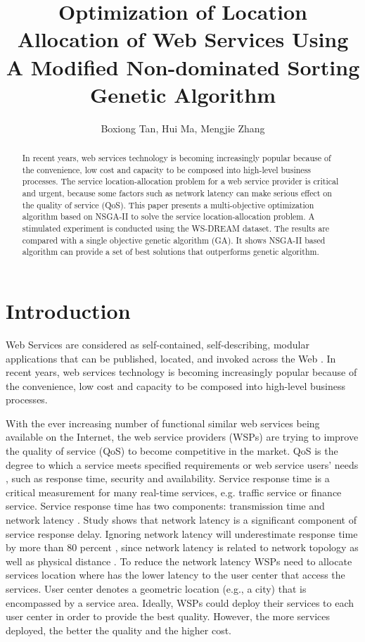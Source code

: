 \documentclass{llncs}
\title{
Optimization of Location Allocation of Web Services Using A Modified Non-dominated Sorting Genetic Algorithm
}
\author{Boxiong Tan, Hui Ma, Mengjie Zhang}
\institute{School of Engineering and Computer Science,
\\Victoria University of Wellington, New Zealand \\
\email{\{Boxiong.Tan, Hui.Ma, Mengjie.Zhang\}@ecs.vuw.ac.nz}}
\begin{document}
\maketitle

\begin{abstract}
In recent years, web services technology is becoming increasingly popular because of the convenience, 
low cost and capacity to be composed into high-level business processes. 
The service location-allocation problem for a web service provider is critical and urgent,
because some factors such as network latency can make serious effect on the quality of service (QoS). 
This paper presents a multi-objective optimization algorithm based on NSGA-II to solve the service location-allocation problem. 
A stimulated experiment is conducted using the WS-DREAM dataset. 
The results are compared with a single objective genetic algorithm (GA). 
It shows NSGA-II based algorithm can provide a set of best solutions that outperforms genetic algorithm.
\end{abstract}

\section{Introduction}
Web Services are considered as self-contained, self-describing, modular applications that can be published, located, and invoked across the Web \cite{Ran}. 
In recent years, web services technology is becoming increasingly popular because of the convenience, low cost \cite{Aboolian} and capacity to be composed into high-level business processes.

With the ever increasing number of functional similar web services being available on the Internet, the web service providers (WSPs) are trying to improve the quality of service (QoS) to become competitive in the market.  
QoS is the degree to which a service meets specified requirements or web service users' needs \cite{4061431}, such as response time, security and availability. 
Service response time is a critical measurement for many real-time services, e.g. traffic service or finance service. 
Service response time has two components: transmission time and network latency \cite{Johansson}. 
Study \cite{916684} shows that network latency is a significant component of service response delay.
Ignoring network latency will underestimate response time by more than 80 percent \cite{Sun}, since network latency is related to network topology as well as physical distance \cite{distanceMetrics}. 
To reduce the network latency WSPs need to allocate services location where has the lower latency to the user center that
access the services. 
User center denotes a geometric location (e.g., a city) that is encompassed by a service area. 
Ideally, WSPs could deploy their services to each user center in order to provide the best quality.
However, the more services deployed, the better the quality and the higher cost. 
\end{document}
